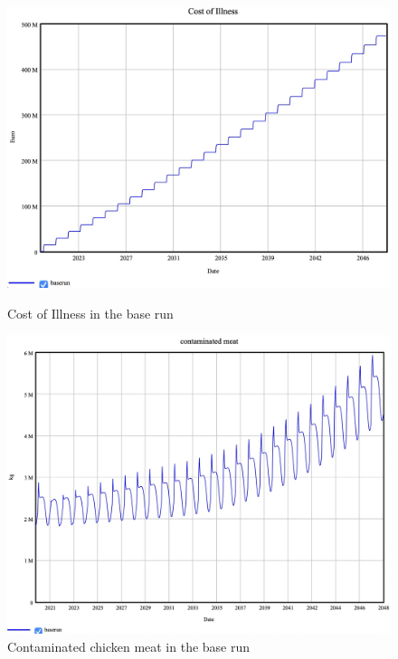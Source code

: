 \begin{figure}[h!]
    \centering
    \begin{minipage}{0.45\textwidth}
        \centering
        \includegraphics[width=1\textwidth]{images/base_COI.jpeg} %
        \caption{Cost of Illness in the base run}
        \label{fig:b_coi}
    \end{minipage}\hfill
    \begin{minipage}{0.45\textwidth}
        \centering
        \includegraphics[width=1\textwidth]{images/base_meat.jpeg} %
        \caption{Contaminated chicken meat in the base run}
        \label{fig:b_meat}
    \end{minipage}
\end{figure}

